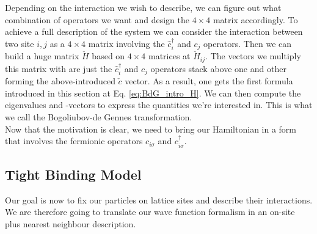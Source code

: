\documentclass[../main.tex]{subfile}
\begin{document}
Depending on the interaction we wish to describe, we can figure out what combination of operators we want and design the $4\times4$ matrix accordingly.
To achieve a full description of the system we can consider the interaction between two site $i,j$ as a $4\times4$ matrix involving the $\hat{c}_i^{\dagger}$ and $c_j$ operators.
Then we can build a huge matrix $\check{H}$ based on $4\times4$ matrices at $\check{H}_{ij}$. The vectors we multiply this matrix with are just the $\hat{c}_i^{\dagger}$ and $c_j$ operators 
stack above one and other forming the above-introduced $\check{c}$ vector. As a result, one gets the first formula introduced in this section at Eq. \ref{eq:BdG_intro_H}.
We can then compute the eigenvalues and -vectors to express the quantities we're interested in. This is what we call the Bogoliubov-de Gennes transformation.\\

Now that the motivation is clear, we need to bring our Hamiltonian in a form that involves the fermionic operators $c_{i\sigma}$ and $c_{i\sigma}^{\dagger}$. 
 
\subsection{Tight Binding Model}
Our goal is now to fix our particles on lattice sites and describe their interactions. We are therefore going to translate our wave function formalism in an on-site plus
nearest neighbour description.\\
\end{document}
